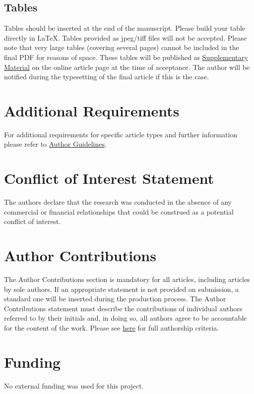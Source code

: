 \documentclass[utf8]{FrontiersinVancouver}
\begin{document}
\subsection{Tables}
Tables should be inserted at the end of the manuscript. Please build your table directly in LaTeX. Tables provided as jpeg/tiff files will not be accepted. Please note that very large tables (covering several pages) cannot be included in the final PDF for reasons of space. These tables will be published as \href{http://home.frontiersin.org/about/author-guidelines#SupplementaryMaterial}{Supplementary Material} on the online article page at the time of acceptance. The author will be notified during the typesetting of the final article if this is the case. 


\section{Additional Requirements}
For additional requirements for specific article types and further information please refer to \href{http://www.frontiersin.org/about/AuthorGuidelines#AdditionalRequirements}{Author Guidelines}.

\section*{Conflict of Interest Statement}
The authors declare that the research was conducted in the absence of any commercial or financial relationships that could be construed as a potential conflict of interest.

\section*{Author Contributions}

The Author Contributions section is mandatory for all articles, including articles by sole authors. If an appropriate statement is not provided on submission, a standard one will be inserted during the production process. The Author Contributions statement must describe the contributions of individual authors referred to by their initials and, in doing so, all authors agree to be accountable for the content of the work. Please see  \href{https://www.frontiersin.org/about/policies-and-publication-ethics#AuthorshipAuthorResponsibilities}{here} for full authorship criteria.

\section*{Funding}
No external funding was used for this project.
\end{document}
